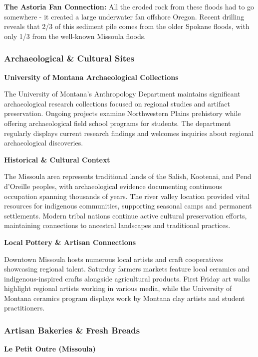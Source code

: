 \documentclass[
  11pt,
  letterpaper,
  DIV=10,
  numbers=noendperiod]{scrartcl}
\begin{document}
\textbf{The Astoria Fan Connection:} All the eroded rock from these
floods had to go somewhere - it created a large underwater fan offshore
Oregon. Recent drilling reveals that 2/3 of this sediment pile comes
from the older Spokane floods, with only 1/3 from the well-known
Missoula floods.

\subsubsection{Archaeological \& Cultural
Sites}\label{archaeological-cultural-sites}

\textbf{University of Montana Archaeological Collections}

The University of Montana's Anthropology Department maintains
significant archaeological research collections focused on regional
studies and artifact preservation. Ongoing projects examine Northwestern
Plains prehistory while offering archaeological field school programs
for students. The department regularly displays current research
findings and welcomes inquiries about regional archaeological
discoveries.

\textbf{Historical \& Cultural Context}

The Missoula area represents traditional lands of the Salish, Kootenai,
and Pend d'Oreille peoples, with archaeological evidence documenting
continuous occupation spanning thousands of years. The river valley
location provided vital resources for indigenous communities, supporting
seasonal camps and permanent settlements. Modern tribal nations continue
active cultural preservation efforts, maintaining connections to
ancestral landscapes and traditional practices.

\textbf{Local Pottery \& Artisan Connections}

Downtown Missoula hosts numerous local artists and craft cooperatives
showcasing regional talent. Saturday farmers markets feature local
ceramics and indigenous-inspired crafts alongside agricultural products.
First Friday art walks highlight regional artists working in various
media, while the University of Montana ceramics program displays work by
Montana clay artists and student practitioners.

\subsubsection{Artisan Bakeries \& Fresh
Breads}\label{artisan-bakeries-fresh-breads}

\textbf{Le Petit Outre (Missoula)}
\end{document}
